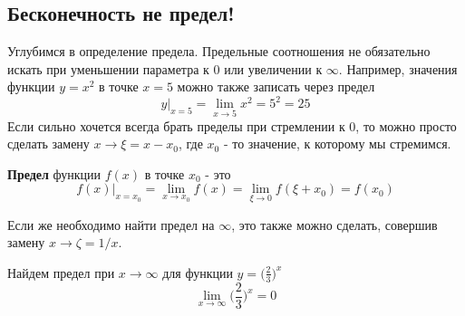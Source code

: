 \subsection{Бесконечность не предел!}
Углубимся в определение предела. Предельные соотношения не обязательно искать при уменьшении параметра к $0$ или увеличении к $\infty$. Например, значения функции $y = x^2$ в точке $x = 5$ можно также записать через предел
\begin{equation*}
    y|_{x = 5} = \lim_{x \rightarrow 5} x^2 = 5^2 = 25
\end{equation*}
Если сильно хочется всегда брать пределы при стремлении к $0$, то можно просто сделать замену $x \rightarrow \xi = x - x_0$, где $x_0$ - то значение, к которому мы стремимся.
\begin{definition}
    \textbf{Предел} функции $f(x)$ в точке $x_0$ - это 
    \begin{equation*}
        f(x)|_{x = x_0} = \lim_{x \rightarrow x_0} f(x) = \lim_{\xi \rightarrow 0} f(\xi + x_0) = f(x_0)
    \end{equation*}
\end{definition}
Если же необходимо найти предел на $\infty$, это также можно сделать, совершив замену $x \rightarrow \zeta = 1/x$.
\begin{example}
    Найдем предел при $x \rightarrow \infty$ для функции $y = \bigl(\frac{2}{3} \bigr)^x$
    \begin{equation*}
        \lim_{x \rightarrow \infty} \bigl( \frac{2}{3}\bigr)^x = 0
    \end{equation*}
\end{example}


